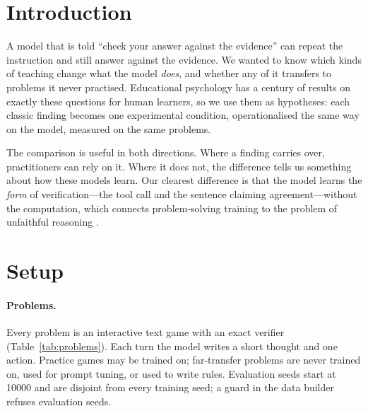 \documentclass[11pt]{article}
\begin{document}
\begin{abstract}
distillation agrees; both gains are on practised tasks. Fine-tuning once on the model's own winning practice
episodes (rejection sampling) does reach the renamed problems: on fresh problems it solves 19/21 Parcels puzzles
(plain 13) and 34/40 Machine problems (plain 19), 27 to 6 pooled ($p<.001$), and beats policy-gradient RL given
the same samples 25 to 3. Fewer evidence-contradicting actions on never-practised problems
come from having the verifier available, not from the training: the same distilled model contradicts its evidence
in 13 of 20 episodes without the tool and 5 with it. Across all conditions one mechanism predicts failure: an episode
containing an action that contradicts the model's own earlier evidence almost never succeeds.
\end{abstract}

\section{Introduction}
A model that is told ``check your answer against the evidence'' can repeat the instruction and still answer
against the evidence. We wanted to know which kinds of teaching change what the model \emph{does}, and whether any
of it transfers to problems it never practised. Educational psychology has a century of results on exactly these
questions for human learners, so we use them as hypotheses: each classic finding becomes one experimental
condition, operationalised the same way on the model, measured on the same problems.

The comparison is useful in both directions. Where a finding carries over, practitioners can rely on it. Where it
does not, the difference tells us something about how these models learn. Our clearest difference is that the
model learns the \emph{form} of verification---the tool call and the sentence claiming agreement---without the
computation, which connects problem-solving training to the problem of unfaithful reasoning
\citep{turpin2023}.

\section{Setup}
\paragraph{Problems.} Every problem is an interactive text game with an exact verifier (Table~\ref{tab:problems}).
Each turn the model writes a short thought and one action. Practice games may be trained on; far-transfer problems
are never trained on, used for prompt tuning, or used to write rules. Evaluation seeds start at 10000 and are
disjoint from every training seed; a guard in the data builder refuses evaluation seeds.
\end{document}
